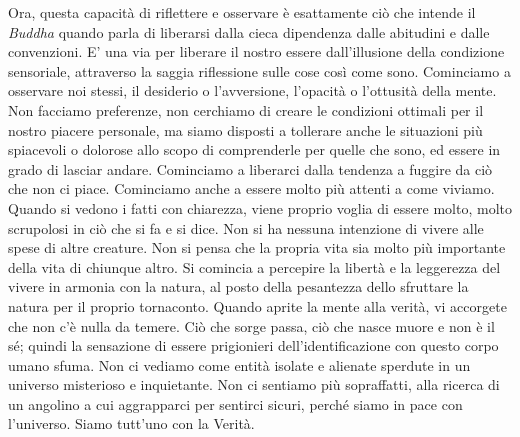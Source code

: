 Ora, questa capacità di riflettere e osservare è esattamente ciò che
intende il \textit{Buddha} quando parla di liberarsi dalla cieca dipendenza dalle
abitudini e dalle convenzioni. E' una via per liberare il nostro essere
dall'illusione della condizione sensoriale, attraverso la saggia
riflessione sulle cose così come sono. Cominciamo a osservare noi
stessi, il desiderio o l'avversione, l'opacità o l'ottusità della mente.
Non facciamo preferenze, non cerchiamo di creare le condizioni ottimali
per il nostro piacere personale, ma siamo disposti a tollerare anche le
situazioni più spiacevoli o dolorose allo scopo di comprenderle per
quelle che sono, ed essere in grado di lasciar andare. Cominciamo a
liberarci dalla tendenza a fuggire da ciò che non ci piace. Cominciamo
anche a essere molto più attenti a come viviamo. Quando si vedono i
fatti con chiarezza, viene proprio voglia di essere molto, molto
scrupolosi in ciò che si fa e si dice. Non si ha nessuna intenzione di
vivere alle spese di altre creature. Non si pensa che la propria vita
sia molto più importante della vita di chiunque altro. Si comincia a
percepire la libertà e la leggerezza del vivere in armonia con la
natura, al posto della pesantezza dello sfruttare la natura per il
proprio tornaconto. Quando aprite la mente alla verità, vi accorgete che
non c'è nulla da temere. Ciò che sorge passa, ciò che nasce muore e non
è il sé; quindi la sensazione di essere prigionieri dell'identificazione
con questo corpo umano sfuma. Non ci vediamo come entità isolate e
alienate sperdute in un universo misterioso e inquietante. Non ci
sentiamo più sopraffatti, alla ricerca di un angolino a cui aggrapparci
per sentirci sicuri, perché siamo in pace con l'universo. Siamo tutt'uno
con la Verità.
